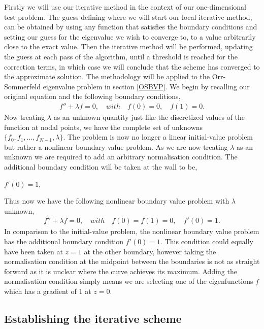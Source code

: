 \documentclass[a4paper, 12pt, twoside, openright]{article}
\numberwithin{equation}{section}
\begin{document}
Firstly we will use our iterative method in the context of our one-dimensional test problem. The guess defining where we will start our local iterative method, can be obtained by using any function that satisfies the boundary conditions and setting our guess for the eigenvalue we wish to converge to, to a value arbitrarily close to the exact value. Then the iterative method will be performed, updating the guess at each pass of the algorithm, until a threshold is reached for the correction terms, in which case we will conclude that the scheme has converged to the approximate solution. The methodology will be applied to the Orr-Sommerfeld eigenvalue problem in section \ref{OSBVP}. We begin by recalling our original equation and the following boundary conditions,     
\begin{align}
f'' + \lambda f = 0,\quad with \quad f(0)=0,\quad f(1)=0.
\end{align}
Now treating $\lambda$ as an unknown quantity just like the discretized values of the function at nodal points, we have the complete set of unknowns $\{ f_0,f_1,...,f_{N-1},\lambda \}$. The problem is now no longer a linear initial-value problem but rather a nonlinear boundary value problem. As we are now treating $\lambda$ as an unknown we are required to add an arbitrary normalisation condition. The additional boundary condition will be taken at the wall to be,
\begin{center}
$f'(0)=1$,
\end{center}
Thus now we have the following nonlinear boundary value problem with $\lambda$ unknown,
\begin{align}
f'' + \lambda f = 0,\quad with \quad f(0)=f(1)=0, \quad f'(0)=1.
\end{align}
In comparison to the initial-value problem, the nonlinear boundary value problem has the additional boundary condition $f'(0)=1$. This condition could equally have been taken at $z=1$ at the other boundary, however taking the normalisation condition at the midpoint between the boundaries is not as straight forward as it is unclear where the curve achieves its maximum. Adding the normalisation condition simply means we are selecting one of the eigenfunctions $f$ which has a gradient of $1$ at $z=0$.%
  
\subsection{Establishing the iterative scheme}
\end{document}
